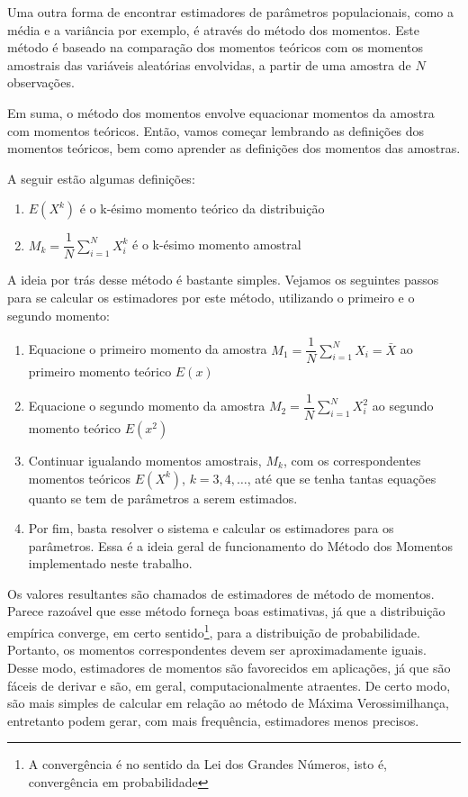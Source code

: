 Uma outra forma de encontrar estimadores de parâmetros populacionais, como a média e a variância por exemplo, é através do método dos momentos. Este método é baseado na comparação dos momentos teóricos com os momentos amostrais das variáveis aleatórias envolvidas, a partir de uma amostra de $N$ observações. 

Em suma, o método dos momentos envolve equacionar momentos da amostra com momentos teóricos. Então, vamos começar lembrando as definições dos momentos teóricos, bem como aprender as definições dos momentos das amostras.

A seguir estão algumas definições:
\begin{enumerate}
	\item $E(X^k)$ é o k-ésimo momento teórico da distribuição 
    \item $M_k=\dfrac{1}{N}\sum\limits_{i=1}^N X_i^k$ é o k-ésimo momento amostral 
\end{enumerate}

A ideia por trás desse método é bastante simples. Vejamos os seguintes passos para se calcular os estimadores por este método, utilizando o primeiro e o segundo momento:
\begin{enumerate}
  \item Equacione o primeiro momento da amostra  $M_1=\dfrac{1}{N}\sum\limits_{i=1}^N X_i=\bar{X}$ ao primeiro momento teórico $E(x)$
  \item Equacione o segundo momento da amostra $M_2=\dfrac{1}{N}\sum\limits_{i=1}^N X_i^2$ ao segundo momento teórico $E(x^2)$
  \item Continuar igualando momentos amostrais, $M_k$, com os correspondentes momentos teóricos  $E(X^k)$, $k = 3, 4, \dots $, até que se tenha tantas equações quanto se tem de parâmetros a serem estimados.
  \item Por fim, basta resolver o sistema e calcular os estimadores para os parâmetros. Essa é a ideia geral de funcionamento do Método dos Momentos implementado neste trabalho.
\end{enumerate}

Os valores resultantes são chamados de estimadores de método de momentos. Parece razoável que esse método forneça boas estimativas, já que a distribuição empírica converge, em certo sentido\footnote{A convergência é no sentido da Lei dos Grandes Números, isto é, convergência em probabilidade}, para a distribuição de probabilidade. Portanto, os momentos correspondentes devem ser aproximadamente iguais. Desse modo, estimadores de momentos são favorecidos em aplicações, já que são fáceis de derivar e são, em geral, computacionalmente atraentes. De certo modo, são mais simples de calcular em relação ao método de Máxima Verossimilhança, entretanto podem gerar, com mais frequência, estimadores menos precisos. 

